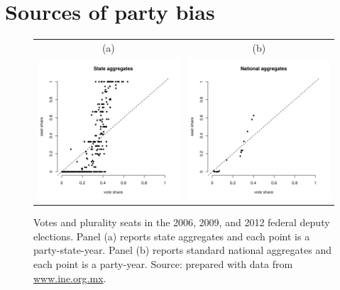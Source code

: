 \documentclass[letter,12pt]{article}
\begin{document}

\section{Sources of party bias}

\begin{figure}
\begin{center}
\begin{tabular}{cc}
    (a) & (b) \\
    \includegraphics[width=.48\columnwidth]{resXedo20062012sh.pdf} &
    \includegraphics[width=.48\columnwidth]{resNal20062012sh.pdf} 
\end{tabular}
\caption{Votes and plurality seats in the 2006, 2009, and 2012 federal deputy elections. Panel (a) reports state aggregates and each point is a party-state-year. Panel (b) reports standard national aggregates and each point is a party-year. Source: prepared with data from \url{www.ine.org.mx}.}\label{F:seatsVotes}
\end{center}
\end{figure}
\end{document}
